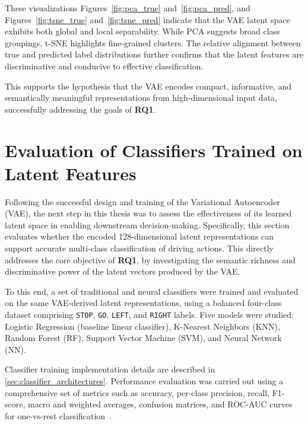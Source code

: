 These visualizations Figures~\ref{fig:pca_true} and~\ref{fig:pca_pred}, and Figures~\ref{fig:tsne_true} and~\ref{fig:tsne_pred} indicate that the VAE latent space exhibits both global and local separability. While PCA suggests broad class groupings, t-SNE highlights fine-grained clusters. The relative alignment between true and predicted label distributions further confirms that the latent features are discriminative and conducive to effective classification.

This supports the hypothesis that the VAE encodes compact, informative, and semantically meaningful representations from high-dimensional input data, successfully addressing the goals of \textbf{RQ1}.










\section{Evaluation of Classifiers Trained on Latent Features} \label{sec:classifier_eval}

Following the successful design and training of the Variational Autoencoder (VAE), the next step in this thesis was to assess the effectiveness of its learned latent space in enabling downstream decision-making. Specifically, this section evaluates whether the encoded 128-dimensional latent representations can support accurate multi-class classification of driving actions. This directly addresses the core objective of \textbf{RQ1}, by investigating the semantic richness and discriminative power of the latent vectors produced by the VAE.

To this end, a set of traditional and neural classifiers were trained and evaluated on the same VAE-derived latent representations, using a balanced four-class dataset comprising \texttt{STOP}, \texttt{GO}, \texttt{LEFT}, and \texttt{RIGHT} labels. Five models were studied: Logistic Regression (baseline linear classifier), K-Nearest Neighbors (KNN), Random Forest (RF), Support Vector Machine (SVM), and Neural Network (NN).

Classifier training implementation details are described in \cref{sec:classifier_architectures}. Performance evaluation was carried out using a comprehensive set of metrics such as accuracy, per-class precision, recall, F1-score, macro and weighted averages, confusion matrices, and ROC-AUC curves for one-vs-rest classification~\cite{labelf2025metrics, roc_auc2024, svm_rf_knn2017}.



